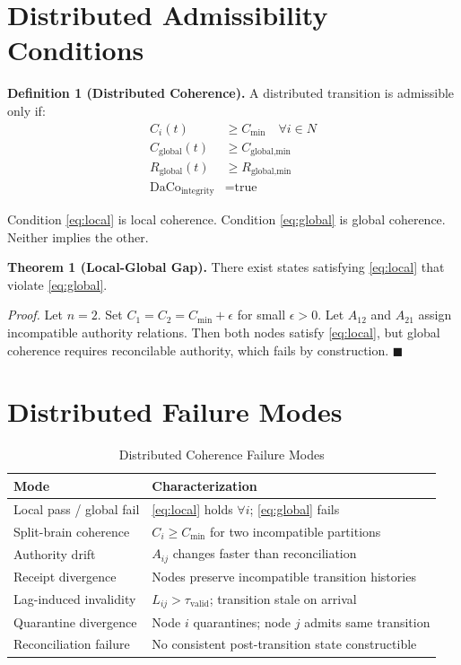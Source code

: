 \documentclass[letterpaper,10pt,conference]{ieeeconf}
\newcommand{\Lij}{L_{ij}}
\begin{document}
\section{Distributed Admissibility Conditions}

\textbf{Definition 1 (Distributed Coherence).} A distributed transition is admissible only if:
\begin{align}
C_i(t) &\ge C_{\min} \quad \forall i \in N \label{eq:local}\\
C_{\text{global}}(t) &\ge C_{\text{global,min}} \label{eq:global}\\
R_{\text{global}}(t) &\ge R_{\text{global,min}} \label{eq:recovery}\\
\text{DaCo}_{\text{integrity}} &= \text{true} \label{eq:daco}
\end{align}

Condition \eqref{eq:local} is local coherence. Condition \eqref{eq:global} is global coherence. Neither implies the other.

\textbf{Theorem 1 (Local-Global Gap).} There exist states satisfying \eqref{eq:local} that violate \eqref{eq:global}.

\textit{Proof.} Let $n=2$. Set $C_1 = C_2 = C_{\min} + \epsilon$ for small $\epsilon > 0$. Let $A_{12}$ and $A_{21}$ assign incompatible authority relations. Then both nodes satisfy \eqref{eq:local}, but global coherence requires reconcilable authority, which fails by construction. \hfill $\blacksquare$

\section{Distributed Failure Modes}

\begin{table}[h]
\centering
\caption{Distributed Coherence Failure Modes}
\begin{tabular}{ll}
\hline
Mode & Characterization \\
\hline
Local pass / global fail & \eqref{eq:local} holds $\forall i$; \eqref{eq:global} fails \\
Split-brain coherence & $C_i \ge C_{\min}$ for two incompatible partitions \\
Authority drift & $A_{ij}$ changes faster than reconciliation \\
Receipt divergence & Nodes preserve incompatible transition histories \\
Lag-induced invalidity & $\Lij > \tau_{\text{valid}}$; transition stale on arrival \\
Quarantine divergence & Node $i$ quarantines; node $j$ admits same transition \\
Reconciliation failure & No consistent post-transition state constructible \\
\hline
\end{tabular}
\end{table}
\end{document}
